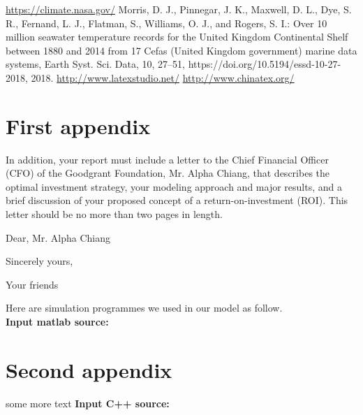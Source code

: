 \documentclass{mcmthesis}
\begin{document}
\newpage
\begin{thebibliography}{99}
\url{https://climate.nasa.gov/}
Morris, D. J., Pinnegar, J. K., Maxwell, D. L., Dye, S. R., Fernand, L. J., Flatman, S., Williams, O. J., and Rogers, S. I.: Over 10 million seawater temperature records for the United Kingdom Continental Shelf between 1880 and 2014 from 17 Cefas (United Kingdom government) marine data systems, Earth Syst. Sci. Data, 10, 27–51, https://doi.org/10.5194/essd-10-27-2018, 2018.
\url{http://www.latexstudio.net/}
\url{http://www.chinatex.org/}
\end{thebibliography}



\newpage
\begin{appendices}

\section{First appendix}

In addition, your report must include a letter to the Chief Financial Officer (CFO) of the Goodgrant Foundation, Mr. Alpha Chiang, that describes the optimal investment strategy, your modeling approach and major results, and a brief discussion of your proposed concept of a return-on-investment (ROI). This letter should be no more than two pages in length.

\begin{letter}{Dear, Mr. Alpha Chiang}

\lipsum[1-2]

\vspace{\parskip}

Sincerely yours,

Your friends

\end{letter}
Here are simulation programmes we used in our model as follow.\\

\textbf{\textcolor[rgb]{0.98,0.00,0.00}{Input matlab source:}}


\section{Second appendix}

some more text \textcolor[rgb]{0.98,0.00,0.00}{\textbf{Input C++ source:}}


\end{appendices}
\end{document}
